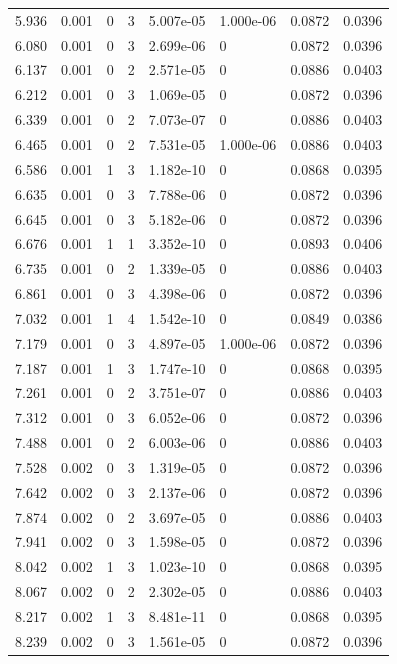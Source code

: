 \documentclass[preview]{standalone}
\begin{document}
{{{\begin{tabular}{L{1.2cm}C{1.2cm} C{0.3cm}C{0.5cm} C{1.4cm}C{1.4cm} C{1.4cm}C{1.4cm}}
  5.936  &  0.001  & 0     &  3 &  5.007e-05  & 1.000e-06  & 0.0872 &  0.0396   \\ 
  6.080  &  0.001  & 0     &  3 &  2.699e-06  & 0  & 0.0872 &  0.0396   \\ 
  6.137  &  0.001  & 0     &  2 &  2.571e-05  & 0  & 0.0886 &  0.0403   \\ 
  6.212  &  0.001  & 0     &  3 &  1.069e-05  & 0  & 0.0872 &  0.0396   \\ 
  6.339  &  0.001  & 0     &  2 &  7.073e-07  & 0  & 0.0886 &  0.0403   \\ 
  6.465  &  0.001  & 0     &  2 &  7.531e-05  & 1.000e-06  & 0.0886 &  0.0403   \\ 
  6.586  &  0.001  & 1     &  3 &  1.182e-10  & 0  & 0.0868 &  0.0395   \\ 
  6.635  &  0.001  & 0     &  3 &  7.788e-06  & 0  & 0.0872 &  0.0396   \\ 
  6.645  &  0.001  & 0     &  3 &  5.182e-06  & 0  & 0.0872 &  0.0396   \\ 
  6.676  &  0.001  & 1     &  1 &  3.352e-10  & 0  & 0.0893 &  0.0406   \\ 
  6.735  &  0.001  & 0     &  2 &  1.339e-05  & 0  & 0.0886 &  0.0403   \\ 
  6.861  &  0.001  & 0     &  3 &  4.398e-06  & 0  & 0.0872 &  0.0396   \\ 
  7.032  &  0.001  & 1     &  4 &  1.542e-10  & 0  & 0.0849 &  0.0386   \\ 
  7.179  &  0.001  & 0     &  3 &  4.897e-05  & 1.000e-06  & 0.0872 &  0.0396   \\ 
  7.187  &  0.001  & 1     &  3 &  1.747e-10  & 0  & 0.0868 &  0.0395   \\ 
  7.261  &  0.001  & 0     &  2 &  3.751e-07  & 0  & 0.0886 &  0.0403   \\ 
  7.312  &  0.001  & 0     &  3 &  6.052e-06  & 0  & 0.0872 &  0.0396   \\ 
  7.488  &  0.001  & 0     &  2 &  6.003e-06  & 0  & 0.0886 &  0.0403   \\ 
  7.528  &  0.002  & 0     &  3 &  1.319e-05  & 0  & 0.0872 &  0.0396   \\ 
  7.642  &  0.002  & 0     &  3 &  2.137e-06  & 0  & 0.0872 &  0.0396   \\ 
  7.874  &  0.002  & 0     &  2 &  3.697e-05  & 0  & 0.0886 &  0.0403   \\ 
  7.941  &  0.002  & 0     &  3 &  1.598e-05  & 0  & 0.0872 &  0.0396   \\ 
  8.042  &  0.002  & 1     &  3 &  1.023e-10  & 0  & 0.0868 &  0.0395   \\ 
  8.067  &  0.002  & 0     &  2 &  2.302e-05  & 0  & 0.0886 &  0.0403   \\ 
  8.217  &  0.002  & 1     &  3 &  8.481e-11  & 0  & 0.0868 &  0.0395   \\ 
  8.239  &  0.002  & 0     &  3 &  1.561e-05  & 0  & 0.0872 &  0.0396   \\ 
\hline 
\end{tabular} 

}}}
\end{document}
